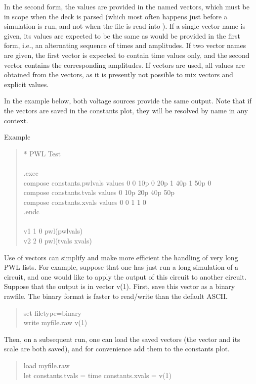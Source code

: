 In the second form, the values are provided in the named vectors,
which must be in scope when the deck is parsed (which most often
happens just before a simulation is run, and not when the file is read
into {\WRspice}).  If a single vector name is given, its values are
expected to be the same as would be provided in the first form, i.e.,
an alternating sequence of times and amplitudes.  If two vector names
are given, the first vector is expected to contain time values only,
and the second vector contains the corresponding amplitudes.  If
vectors are used, all values are obtained from the vectors, as it is
presently not possible to mix vectors and explicit values.

In the example below, both voltage sources provide the same output. 
Note that if the vectors are saved in the {\vt constants} plot, they
will be resolved by name in any context.

Example
\begin{quote}\vt
* PWL Test\\
\\
.exec\\
compose constants.pwlvals values 0 0 10p 0 20p 1 40p 1 50p 0\\
compose constants.tvals values 0 10p 20p 40p 50p\\
compose constants.xvals values 0 0 1 1 0\\
.endc\\
\\
v1 1 0 pwl(pwlvals)\\
v2 2 0 pwl(tvals xvals)
\end{quote}

Use of vectors can simplify and make more efficient the handling of
very long PWL lists.  For example, suppose that one has just run a
long simulation of a circuit, and one would like to apply the output
of this circuit to another circuit.  Suppose that the output is in
vector {\vt v(1)}.  First, save this vector as a binary rawfile.  The
binary format is faster to read/write than the default ASCII.

\begin{quote}\vt
set filetype=binary\\
write myfile.raw v(1)
\end{quote}

Then, on a subsequent run, one can load the saved vectors (the vector
and its scale are both saved), and for convenience add them to the
{\vt constants} plot.

\begin{quote}\vt
load myfile.raw\\
let constants.tvals = time constants.xvals = v(1)
\end{quote}

